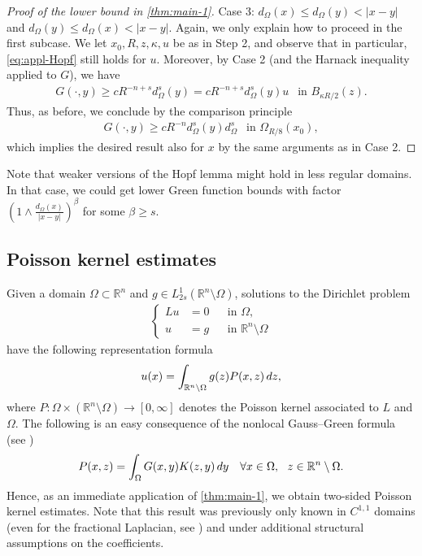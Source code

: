 \documentclass[11pt,reqno]{amsart}
\theoremstyle{plain}
\theoremstyle{definition}
\numberwithin{equation}{section}
\newcommand{\R}{\mathbb{R}}
\newcommand{\1}{\mathbbm{1}}
\renewcommand{\d}{\textnormal{\,d}}
\begin{document}
\begin{proof}[Proof of the lower bound in \autoref{thm:main-1}]
Case 3: $d_{\Omega}(x) \le d_{\Omega}(y) < |x-y|$ and $d_{\Omega}(y) \le d_{\Omega}(x) < |x-y|$. Again, we only explain how to proceed in the first subcase. We let $x_0,R,z,\kappa,u$ be as in Step 2, and observe that in particular, \eqref{eq:appl-Hopf} still holds for $u$. Moreover, by Case 2 (and the Harnack inequality applied to $G$), we have
\begin{align*}
    G(\cdot,y) \ge c R^{-n+s} d_{\Omega}^s(y) = c R^{-n+s} d_{\Omega}^s(y) u ~~ \text{ in } B_{\kappa R/2}(z). 
\end{align*}
Thus, as before, we conclude by the comparison principle
\begin{align*}
    G(\cdot,y) \ge c R^{-n} d_{\Omega}^s(y) d_{\Omega}^s ~~ \text{ in } \Omega_{R/8}(x_0), 
\end{align*}
which implies the desired result also for $x$ by the same arguments as in Case 2.
\end{proof}

\begin{remark}
    Note that weaker versions of the Hopf lemma might hold in less regular domains. In that case, we could get lower Green function bounds with factor $(1 \wedge \frac{d_{\Omega}(x)}{|x-y|})^{\beta}$ for some $\beta \geq s$.
\end{remark}




\subsection{Poisson kernel estimates}

Given a domain $\Omega \subset \R^n$ and $g \in L^{1}_{2s}(\R^n \setminus \Omega)$, solutions to the Dirichlet problem
\begin{align*}
\left\{
\begin{aligned}
    L u &= 0 &&\text{in } \Omega,\\
    u &= g &&\text{in } \R^n \setminus \Omega
\end{aligned}
\right.
\end{align*}
have the following representation formula
\begin{align*}
    u(x) = \int_{\R^n \setminus \Omega} g(z) P(x,z) \d z,
\end{align*}
where $P : \Omega \times (\R^n \setminus \Omega) \to [0,\infty]$ denotes the Poisson kernel associated to $L$ and $\Omega$. The following is an easy consequence of the nonlocal Gauss--Green formula (see \cite{Buc16})
\begin{align}
\label{eq:Poisson-rep}
    P(x,z) = \int_{\Omega} G(x,y) K(z,y) \d y \quad \forall x \in \Omega,~~ z \in \R^n \setminus \Omega.
\end{align}
Hence, as an immediate application of \autoref{thm:main-1}, we obtain two-sided Poisson kernel estimates. Note that this result was previously only known in $C^{1,1}$ domains (even for the fractional Laplacian, see \cite{ChSo98}) and under additional structural assumptions on the coefficients.
\end{document}
